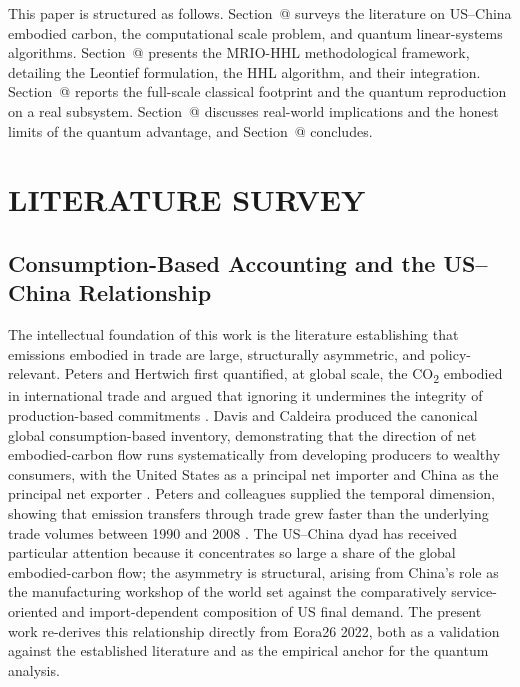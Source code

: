 \documentclass[letterpaper, 10 pt, conference]{ieeeconf}
\makeatletter
\newcommand{\Rom}[1]{\expandafter\@slowromancap\romannumeral #1@}
\newcommand{\COO}{CO\textsubscript{2}}
\makeatother
\begin{document}
This paper is structured as follows. Section~\Rom{2} surveys the literature on US--China embodied carbon, the computational scale problem, and quantum linear-systems algorithms. Section~\Rom{3} presents the MRIO-HHL methodological framework, detailing the Leontief formulation, the HHL algorithm, and their integration. Section~\Rom{4} reports the full-scale classical footprint and the quantum reproduction on a real subsystem. Section~\Rom{5} discusses real-world implications and the honest limits of the quantum advantage, and Section~\Rom{6} concludes.

\section{LITERATURE SURVEY}

\subsection{Consumption-Based Accounting and the US--China Relationship}

The intellectual foundation of this work is the literature establishing that emissions embodied in trade are large, structurally asymmetric, and policy-relevant. Peters and Hertwich first quantified, at global scale, the \COO{} embodied in international trade and argued that ignoring it undermines the integrity of production-based commitments \cite{peters2008}. Davis and Caldeira produced the canonical global consumption-based inventory, demonstrating that the direction of net embodied-carbon flow runs systematically from developing producers to wealthy consumers, with the United States as a principal net importer and China as the principal net exporter \cite{davis2010}. Peters and colleagues supplied the temporal dimension, showing that emission transfers through trade grew faster than the underlying trade volumes between 1990 and 2008 \cite{peters2011}. The US--China dyad has received particular attention because it concentrates so large a share of the global embodied-carbon flow; the asymmetry is structural, arising from China's role as the manufacturing workshop of the world set against the comparatively service-oriented and import-dependent composition of US final demand. The present work re-derives this relationship directly from Eora26 2022, both as a validation against the established literature and as the empirical anchor for the quantum analysis.
\end{document}
